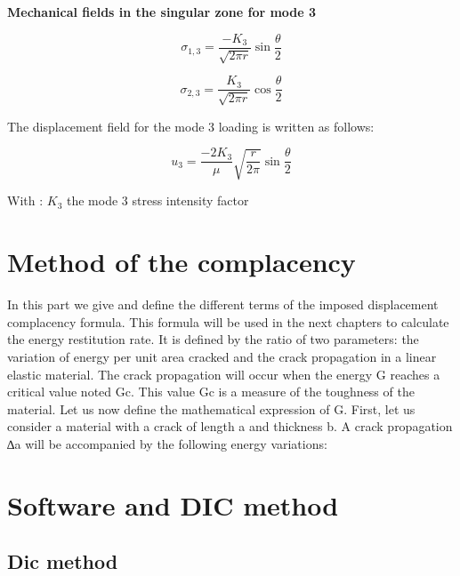 \smallskip

\textbf{Mechanical fields in the singular zone for mode 3}

\begin{equation}
	\sigma_{1,3} = \frac{-K_{3}}{\sqrt{2 \pi r}} \sin{\frac{\theta}{2}}
\end{equation}

\begin{equation}
	\sigma_{2,3} = \frac{K_{3}}{\sqrt{2 \pi r}} \cos{\frac{\theta}{2}}
\end{equation}

The displacement field for the mode 3 loading is written as follows:

\begin{equation}
	u_{3} = \frac{-2 K_{3}}{\mu} \sqrt{\frac{r}{2 \pi}} \sin{\frac{\theta}{2}}
\end{equation}

With : $K_3$  the mode 3 stress intensity factor

\section{Method of the complacency}

In this part we give and define the different terms of the imposed displacement complacency formula. This formula will be used in the next chapters to calculate the energy restitution rate. It is defined by the ratio of two parameters: the variation of energy per unit area cracked and the crack propagation in a linear elastic material. The crack propagation will occur when the energy G reaches a critical value noted Gc. This value Gc is a measure of the toughness of the material. Let us now define the mathematical expression of G. First, let us consider a material with a crack of length a and thickness b. A crack propagation ∆a will be accompanied by the following energy variations:

\section{Software and DIC method}

\subsection{Dic method}

